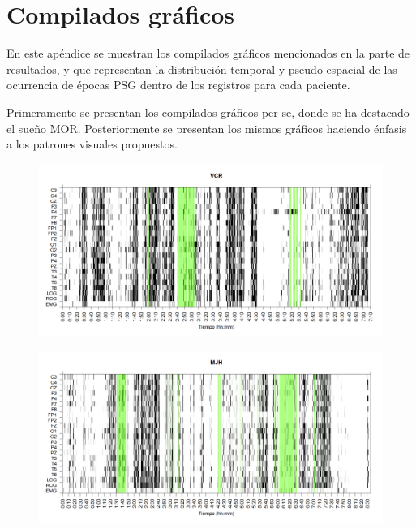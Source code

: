 \documentclass[12pt,a4paper]{mitthesis}
\begin{document}

\chapter{Compilados gr\'aficos}

En este ap\'endice se muestran los compilados gr\'aficos mencionados en la parte de resultados,
y que representan la
distribuci\'on temporal y pseudo-espacial de las ocurrencia de \'epocas PSG dentro de los registros 
para cada paciente. 

Primeramente se presentan los compilados gr\'aficos per se, donde se ha destacado el sue\~no MOR.
Posteriormente se presentan los mismos gr\'aficos haciendo \'enfasis a los patrones visuales
propuestos.

\begin{figure}
\centering
\includegraphics[width=0.9\linewidth]
{./g170413/VCNNS1_est.png} 
\label{grf_VCR}
\end{figure}

\begin{figure}
\centering
\includegraphics[width=0.9\linewidth]
{./g170413/MJNNVIGILOS_est.png} 
\label{grf_MJH}
\end{figure}
\end{document}

